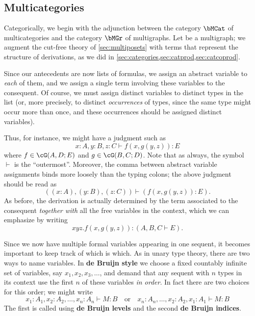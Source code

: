 \documentclass{book}
\let\types\vdash
\begin{document}
\subsection{Multicategories}
\label{sec:multicats}

Categorically, we begin with the adjunction between the category $\bMCat$ of multicategories and the category $\bMGr$ of multigraphs.
Let \cG be a multigraph; we augment the cut-free theory of \cref{sec:multiposets} with terms that represent the structure of derivations, as we did in \cref{sec:categories,sec:catprod,sec:catcoprod}.

Since our antecedents are now lists of formulas, we assign an abstract variable to \emph{each} of them, and we assign a single term involving these variables to the consequent.
Of course, we must assign distinct variables to distinct types in the list (or, more precisely, to distinct \emph{occurrences} of types, since the same type might occur more than once, and these occurrences should be assigned distinct variables).

Thus, for instance, we might have a judgment such as
\[ x:A, y:B, z:C \types f(x,g(y,z)):E \]
where $f\in\cG(A,D;E)$ and $g\in\cG(B,C;D)$.
Note that as always, the symbol $\types$ is the ``outermost''.
Moreover, the comma between abstract variable assignments binds more loosely than the typing colons; the above judgment should be read as
\[ ((x:A), (y:B), (z:C)) \types (f(x,g(y,z)):E). \]
As before, the derivation is actually determined by the term associated to the consequent \emph{together with} all the free variables in the context, which we can emphasize by writing
\[ xyz.f(x,g(y,z)) : (A, B, C \types E). \]

Since we now have multiple formal variables appearing in one sequent, it becomes important to keep track of which is which.
As in unary type theory, there are two ways to name variables.
In \textbf{de Bruijn style} we choose a fixed countably infinite set of variables, say $x_1,x_2,x_3,\dots$, and demand that any sequent with $n$ types in its context use the first $n$ of these variables \emph{in order}.
In fact there are two choices for this order; we might write
\[ x_1:A_1, x_2:A_2, \dots,x_n:A_n \types M:B \quad\text{or}\quad
x_n:A_n,\dots, x_2:A_2, x_1:A_1 \types M:B
\]
The first is called using \textbf{de Bruijn levels} and the second \textbf{de Bruijn indices}.
\end{document}
